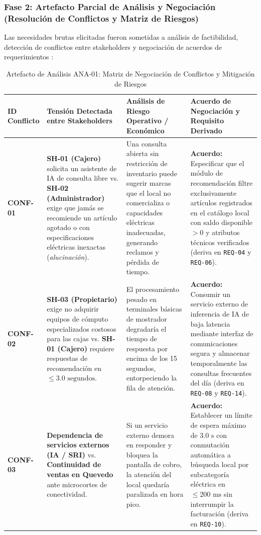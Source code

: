\subsubsection{Fase 2: Artefacto Parcial de Análisis y Negociación (Resolución de Conflictos y Matriz de Riesgos)}
Las necesidades brutas elicitadas fueron sometidas a análisis de factibilidad, detección de conflictos entre stakeholders y negociación de acuerdos de requerimientos \cite{swebok2024, ireb2023}:
\begin{table}[htbp]
	\centering
	\scriptsize
	\caption{Artefacto de Análisis ANA-01: Matriz de Negociación de Conflictos y Mitigación de Riesgos}
	\label{tab:artefacto_analisis}
	\begin{tabularx}{\textwidth}{l Y Y Y}
		\toprule
		\textbf{ID Conflicto} & \textbf{Tensión Detectada entre Stakeholders} & \textbf{Análisis de Riesgo Operativo / Económico} & \textbf{Acuerdo de Negociación y Requisito Derivado} \\
		\midrule
		\textbf{CONF-01} & \textbf{SH-01 (Cajero)} solicita un asistente de IA de consulta libre vs. \textbf{SH-02 (Administrador)} exige que jamás se recomiende un artículo agotado o con especificaciones eléctricas inexactas (\textit{alucinación}). & Una consulta abierta sin restricción de inventario puede sugerir marcas que el local no comercializa o capacidades eléctricas inadecuadas, generando reclamos y pérdida de tiempo. & \textbf{Acuerdo:} Especificar que el módulo de recomendación filtre exclusivamente artículos registrados en el catálogo local con saldo disponible $> 0$ y atributos técnicos verificados (deriva en \texttt{REQ-04} y \texttt{REQ-06}). \\
		\midrule
		\textbf{CONF-02} & \textbf{SH-03 (Propietario)} exige no adquirir equipos de cómputo especializados costosos para las cajas vs. \textbf{SH-01 (Cajero)} requiere respuestas de recomendación en $\le 3.0\text{ segundos}$. & El procesamiento pesado en terminales básicas de mostrador degradaría el tiempo de respuesta por encima de los 15 segundos, entorpeciendo la fila de atención. & \textbf{Acuerdo:} Consumir un servicio externo de inferencia de IA de baja latencia mediante interfaz de comunicaciones segura y almacenar temporalmente las consultas frecuentes del día (deriva en \texttt{REQ-08} y \texttt{REQ-14}). \\
		\midrule
		\textbf{CONF-03} & \textbf{Dependencia de servicios externos (IA / SRI)} vs. \textbf{Continuidad de ventas en Quevedo} ante microcortes de conectividad. & Si un servicio externo demora en responder y bloquea la pantalla de cobro, la atención del local quedaría paralizada en hora pico. & \textbf{Acuerdo:} Establecer un límite de espera máximo de $3.0\text{ s}$ con conmutación automática a búsqueda local por subcategoría eléctrica en $\le 200\text{ ms}$ sin interrumpir la facturación (deriva en \texttt{REQ-10}). \\
		\bottomrule
	\end{tabularx}
\end{table}
